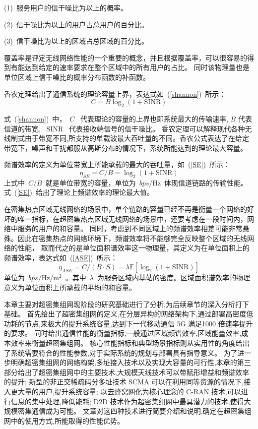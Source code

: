  (1)~服务用户的信干噪比为以上的概率。

 (2)~信干噪比为以上的用户占总用户的百分比。

 (3)~信干噪比为以上的区域占总区域的百分比。

覆盖率是评定无线网络性能的一个重要的概念，并且根据覆盖率，可以很容易的得到有能达到给定的速率要求在整个区域中的所有用户的占比。
同时该物理量也是单位区域上信干噪比的概率分布函数的补函数。

香农定理给出了通信系统的理论容量上界，表达式如~(\ref{shannon})~所示：
\begin{equation}\label{shannon}
  C = B \log_2(1+\mathrm{SINR})
\end{equation}

式~(\ref{shannon})~中，~$C$~ 代表理论的容量的上界也即系统最大的传输速率, $B$ 代表信道的带宽, ~$\mathrm{SINR}$~ 代表接收端信号的信干噪比。
香农定理可以解释现代各种无线制式由于带宽不同,所支持的单载波最大吞吐量的不同。香农公式表达了在给定带宽下，噪声和干扰都服从高斯分布的情况下，系统所能达到的理论最大容量。

频谱效率的定义为单位带宽上所能承载的最大的吞吐量，如~(\ref{SE})~所示：
\begin{equation}\label{SE}
\eta_{SE}=C/B=\log_2(1+\mathrm{SINR})
\end{equation}
上式中~$C/B$~就是单位带宽的容量，单位为~$bps/\mathrm{Hz}$~体现信道链路的传输性能。式~(\ref{SE})~给出了理论上频谱效率的理论最大值。

在密集热点区域无线网络的场景中，单个链路的容量已经不再是衡量一个网络的好坏的唯一指标，在超密集热点区域无线网络的场景中，还要考虑在一段时间内，网络中服务的用户的和容量。
同时，考虑到不同区域上的频谱效率相差可能非常悬殊。因此在密集热点的网络环境下，频谱效率将不能够完全反映整个区域的无线网络的性能，
取而代之的是单位面积谱效率这一物理量，其定义为在单位面积上的频谱效率，表达式如~(\ref{ASE})~所示：
\begin{equation}\label{ASE}
  \eta_{ASE}=C/(B\cdot S) = \lambda\mathbb{E}[\log_2(1+\mathrm{SINR})]
\end{equation}
单位为~$bps/\mathrm{Hz}/\mathrm{m}^2$~。其中~$\lambda$~为服务区域内基站的密度。区域面积谱效率的物理意义为单位面积上所承载的平均的和容量。

本章主要对超密集组网现阶段的研究基础进行了分析,为后续章节的深入分析打下基础。
首先给出了超密集组网的定义,在分层异构的网络架构下,通过部署高密度低功耗的节点,来极大的提升系统容量,达到下一代移动通信 5G 满足1000 倍速率提升的要求。
同时给出通信性能的衡量指标,一般通过区域频谱效率,区域能量效率,成本效率来衡量超密集组网。
核心性能指标和典型场景指标则从实用性的角度给出了系统需要符合的性能参数,对于实际系统的规划与部署具有指导意义。
为了进一步明确超密集组网的网络构架,多址接入技术以及实现大容量的可行性,本章的第三部分给出了超密集组网中的主要技术,大规模天线技术可以带赋形增益和频谱效率的提升;
新型的非正交稀疏码分多址技术 SCMA 可以在利用同等资源的情况下,接入更大量的用户,提升系统容量;
以去蜂窝网化为核心理念的 C-RAN 技术,可以进行信息的集中处理,降低能耗;
D2D 技术作为超密集组网中最具潜力的技术,使得大规模密集通信成为可能。
文章对这四种技术进行简要介绍和说明,确定在超密集组网中的使用方式,所能取得的性能优势。
